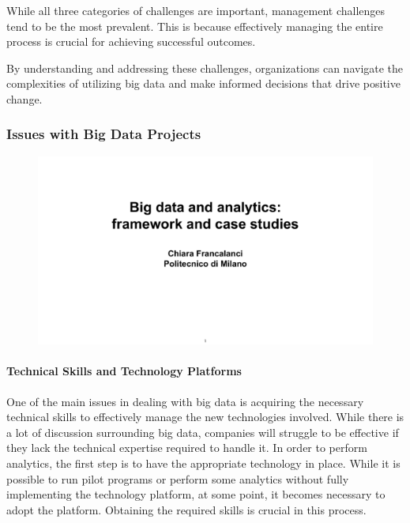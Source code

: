 While all three categories of challenges are important, management
challenges tend to be the most prevalent. This is because effectively
managing the entire process is crucial for achieving successful
outcomes.

By understanding and addressing these challenges, organizations can
navigate the complexities of utilizing big data and make informed
decisions that drive positive change.

\subsubsection{Issues with Big Data Projects}

\begin{figure}[!h]
    \centering
    \includegraphics[page=40, trim = 0cm 3.5cm 1.5cm 4.5cm, clip, width=\textwidth]{images/06 - BIG_DATA.pdf}
\end{figure}

\paragraph{Technical Skills and Technology Platforms}

One of the main issues in dealing with big data is acquiring the
necessary technical skills to effectively manage the new technologies
involved. While there is a lot of discussion surrounding big data,
companies will struggle to be effective if they lack the technical
expertise required to handle it. In order to perform analytics, the
first step is to have the appropriate technology in place. While it is
possible to run pilot programs or perform some analytics without fully
implementing the technology platform, at some point, it becomes
necessary to adopt the platform. Obtaining the required skills is
crucial in this process.

